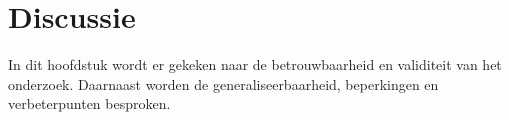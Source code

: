 \chapter{Discussie}
In dit hoofdstuk wordt er gekeken naar de betrouwbaarheid en validiteit van het onderzoek.
Daarnaast worden de generaliseerbaarheid, beperkingen en verbeterpunten besproken.





